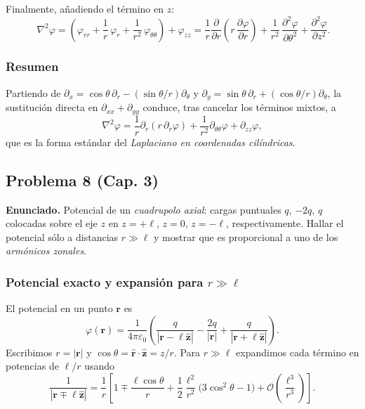 \documentclass{article}
\begin{document}
Finalmente, añadiendo el término en $z$:
\[
\boxed{\ \nabla^{2}\varphi
=\left(\varphi_{rr}+\frac{1}{r}\,\varphi_{r}+\frac{1}{r^{2}}\,\varphi_{\theta\theta}\right)
+\varphi_{zz}
=\frac{1}{r}\frac{\partial}{\partial r}\!\left(r\,\frac{\partial\varphi}{\partial r}\right)
+\frac{1}{r^{2}}\,\frac{\partial^{2}\varphi}{\partial \theta^{2}}
+\frac{\partial^{2}\varphi}{\partial z^{2}}.}
\]

\subsubsection*{Resumen}
Partiendo de $\partial_x=\cos\theta\,\partial_r-(\sin\theta/r)\partial_\theta$ y 
$\partial_y=\sin\theta\,\partial_r+(\cos\theta/r)\partial_\theta$, la sustitución directa en
$\partial_{xx}+\partial_{yy}$ conduce, tras cancelar los términos mixtos, a
\[
\nabla^{2}\varphi=\frac{1}{r}\partial_r(r\,\partial_r\varphi)+\frac{1}{r^{2}}\partial_{\theta\theta}\varphi+\partial_{zz}\varphi,
\]
que es la forma estándar del \emph{Laplaciano en coordenadas cilíndricas}.


\subsection{Problema 8 (Cap. 3)} \vspace{0.5cm}

\textbf{Enunciado.} Potencial de un \emph{cuadrupolo axial}: cargas puntuales $q$, $-2q$, $q$ colocadas sobre el eje $z$ en $z=+\ell$, $z=0$, $z=-\ell$, respectivamente. Hallar el potencial sólo a distancias $r\gg \ell$ y mostrar que es proporcional a uno de los \emph{armónicos zonales}.

\subsubsection*{Potencial exacto y expansión para $r\gg \ell$}
El potencial en un punto $\mathbf r$ es
\[
\varphi(\mathbf r)
=\frac{1}{4\pi\varepsilon_0}\left(
\frac{q}{|\mathbf r-\ell\hat{\mathbf z}|}
-\frac{2q}{|\mathbf r|}
+\frac{q}{|\mathbf r+\ell\hat{\mathbf z}|}
\right).
\]
Escribimos $r=|\mathbf r|$ y $\cos\theta=\hat{\mathbf r}\!\cdot\!\hat{\mathbf z}=z/r$. Para $r\gg \ell$ expandimos cada término en potencias de $\ell/r$ usando
\[
\frac{1}{|\mathbf r\mp \ell\hat{\mathbf z}|}
=\frac{1}{r}\left[
1\mp \frac{\ell\cos\theta}{r}
+\frac{1}{2}\frac{\ell^{2}}{r^{2}}\big(3\cos^{2}\theta-1\big)
+ \mathcal O\!\left(\frac{\ell^{3}}{r^{3}}\right)
\right].
\]
\end{document}
